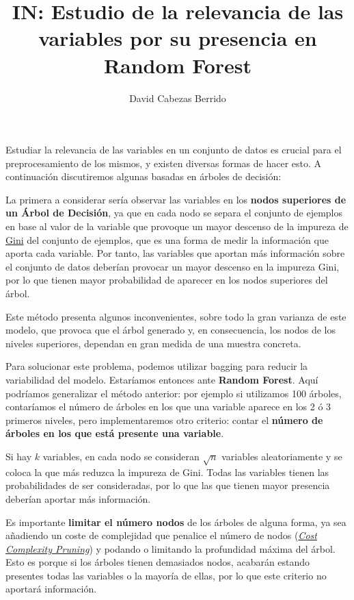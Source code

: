 \documentclass{article}
\title{\Huge IN: Estudio de la relevancia de las variables por su presencia en Random Forest \vspace{10mm}}
\author{\huge David Cabezas Berrido}
\begin{document}
\maketitle

Estudiar la relevancia de las variables en un conjunto de datos es
crucial para el preprocesamiento de los mismos, y existen diversas
formas de hacer esto. A continuación discutiremos algunas basadas en
árboles de decisión:

La primera a considerar sería observar las variables en los
\textbf{nodos superiores de un Árbol de Decisión}, ya que en cada nodo
se separa el conjunto de ejemplos en base al valor de la variable que
provoque un mayor descenso de la impureza de
\href{https://es.wikipedia.org/wiki/Aprendizaje_basado_en_%C3%A1rboles_de_decisi%C3%B3n#Impureza_de_Gini}{Gini}
  del conjunto de ejemplos, que es una forma de medir la información
  que aporta cada variable. Por tanto, las variables que aportan más
  información sobre el conjunto de datos deberían provocar un mayor
  descenso en la impureza Gini, por lo que tienen mayor probabilidad
  de aparecer en los nodos superiores del árbol.

  Este método presenta algunos inconvenientes, sobre todo la gran
  varianza de este modelo, que provoca que el árbol generado y, en
  consecuencia, los nodos de los niveles superiores, dependan en gran
  medida de una muestra concreta.

  Para solucionar este problema, podemos utilizar bagging para reducir
  la variabilidad del modelo. Estaríamos entonces ante \textbf{Random
    Forest}. Aquí podríamos generalizar el método anterior: por
  ejemplo si utilizamos 100 árboles, contaríamos el número de árboles
  en los que una variable aparece en los 2 ó 3 primeros niveles, pero
  implementaremos otro criterio: contar el \textbf{número de árboles
    en los que está presente una variable}.

  Si hay $k$ variables, en cada nodo se consideran $\sqrt{n}$
  variables aleatoriamente y se coloca la que más reduzca la impureza
  de Gini. Todas las variables tienen las probabilidades de ser
  consideradas, por lo que las que tienen mayor presencia deberían
  aportar más información.

  Es importante \textbf{limitar el número nodos} de los árboles de
  alguna forma, ya sea añadiendo un coste de complejidad que penalice
  el número de nodos
  (\href{https://www.analyticsvidhya.com/blog/2020/10/cost-complexity-pruning-decision-trees/}{\emph{Cost
      Complexity Pruning}}) y podando o limitando la profundidad
  máxima del árbol. Esto es porque si los árboles tienen demasiados
  nodos, acabarán estando presentes todas las variables o la mayoría
  de ellas, por lo que este criterio no aportará información.
\end{document}
